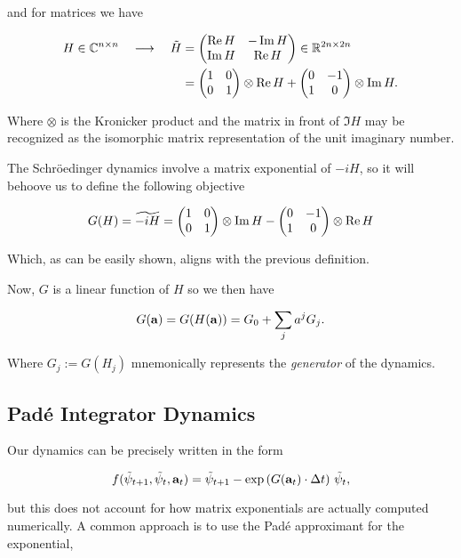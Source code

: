 \documentclass{article}
\newcommand{\isopsi}{\tilde \psi}
\begin{document}
\noindent
and for matrices we have

\begin{align}
  H \in \mathbb{C}^{n \times n} \quad \longrightarrow \quad \tilde{H} &= \mqty(\Re H & -\Im H \\ \Im H & \Re H) \in \mathbb{R}^{2n \times 2n} \\
  &= \mqty(1 & 0 \\ 0 & 1) \otimes \Re H + \mqty(0 & -1 \\ 1 & 0) \otimes \Im H.
\end{align}

\noindent
Where $\otimes$ is the Kronicker product and the matrix in front of $\Im H$ may be recognized as the isomorphic matrix representation of the unit imaginary number. 

The Schr\"oedinger dynamics involve a matrix exponential of $-iH$, so it will behoove us to define the following objective

\begin{equation}
  G(H) = \widetilde{-iH} = \mqty(1 & 0 \\ 0 & 1) \otimes \Im H - \mqty(0 & -1 \\ 1 & 0) \otimes \Re H
\end{equation}

\noindent
Which, as can be easily shown, aligns with the previous definition.

Now, $G$ is a linear function of $H$ so we then have

\begin{equation}
  G(\vb{a}) = G(H(\vb{a})) = G_0 + \sum_j a^j G_j.
\end{equation}

\noindent
Where $G_j := G(H_j)$ mnemonically represents the \textit{generator} of the dynamics.



\subsection{Pad\'e Integrator Dynamics}
Our dynamics can be precisely written in the form 

\begin{equation}
  f(\isopsi_{t+1}, \isopsi_t, \vb{a}_t) = \isopsi_{t+1} - \exp\qty(G(\vb{a}_t) \cdot \Delta t) \ \isopsi_t,
\end{equation}

\noindent
but this does not account for how matrix exponentials are actually computed numerically. A common approach is to use the Pad\'e approximant for the exponential,
\end{document}
